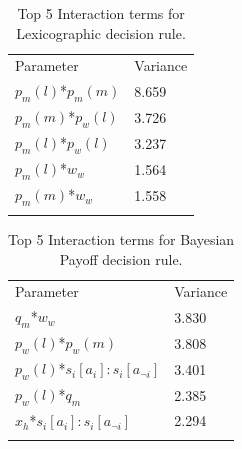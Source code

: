 \documentclass[graybox]{svmult}
\begin{document}
\begin{table}[H]
\caption{Top 5 Interaction terms for Lexicographic decision rule. \label{tab:sa_interaction_lexic_group_iqr_iqr}}
\begin{tabular} {ll}
\hline\noalign{\smallskip}
Parameter & Variance \\
\noalign{\smallskip}\svhline\noalign{\smallskip}
\(p_{m}(l)\)*\(p_{m}(m)\) & 8.659\\
\(p_{m}(m)\)*\(p_{w}(l)\) & 3.726\\
\(p_{m}(l)\)*\(p_{w}(l)\) & 3.237\\
\(p_{m}(l)\)*\(w_{w}\) & 1.564\\
\(p_{m}(m)\)*\(w_{w}\) & 1.558\\
\noalign{\smallskip}\hline\noalign{\smallskip}
\end{tabular}
\end{table}

\begin{table}[H]
\caption{Top 5 Interaction terms for Bayesian Payoff decision rule. \label{tab:sa_interaction_payoff_group_iqr_iqr}}
\begin{tabular} {ll}
\hline\noalign{\smallskip}
Parameter & Variance \\
\noalign{\smallskip}\svhline\noalign{\smallskip}
\(q_{m}\)*\(w_{w}\) & 3.830\\
\(p_{w}(l)\)*\(p_{w}(m)\) & 3.808\\
\(p_{w}(l)\)*\(s_{i}[a_{i}]:s_{i}[a_{\neg i}]\) & 3.401\\
\(p_{w}(l)\)*\(q_{m}\) & 2.385\\
\(x_{h}\)*\(s_{i}[a_{i}]:s_{i}[a_{\neg i}]\) & 2.294\\ 
\noalign{\smallskip}\hline\noalign{\smallskip}
\end{tabular}
\end{table}

  
\end{document}

